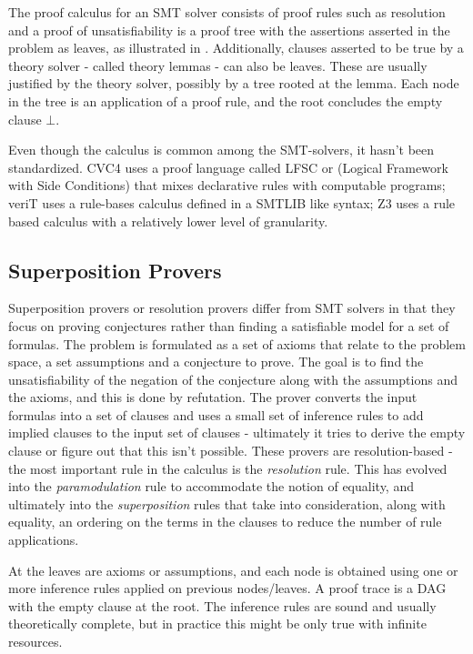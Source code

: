 \documentclass{article}
\begin{document}
	The proof calculus for an SMT solver consists 
	of proof rules such as resolution and a 
	proof of unsatisfiability is a proof tree with 
	the assertions asserted in the problem as 
	leaves, as illustrated in .
	Additionally, clauses asserted to 
	be true by a theory solver - called theory lemmas 
	- can also be leaves. These are usually 
	justified by the theory solver, possibly by 
	a tree rooted at the lemma. Each node in 
	the tree is an application of a proof rule, 
	and the root concludes the empty clause $\bot$.
	
	Even though the calculus is common among the SMT-solvers, 
	it hasn't been standardized. CVC4 uses a proof language called
	LFSC or (Logical Framework with Side Conditions) that mixes 
	declarative rules with computable programs; veriT uses a rule-bases 
	calculus defined in a SMTLIB like syntax; Z3 uses a rule based 
	calculus with a relatively lower level of granularity. 
	
	\subsection{Superposition Provers}
	\label{sup}
	Superposition provers or resolution provers differ 
	from SMT solvers in that they focus on proving 
	conjectures rather than finding a satisfiable model
	for a set of formulas. The problem is formulated 
	as a set of axioms that relate to the problem space, 
	a set assumptions and a conjecture to prove. 
	The goal is to find the unsatisfiability of 
	the negation of the conjecture along with the 
	assumptions and the axioms, and this is done 
	by refutation. The prover converts 
	the input formulas into a set of clauses and 
	uses a small set of inference rules to add 
	implied clauses to the input set of 
	clauses - ultimately it tries to derive 
	the empty clause or figure out that this 
	isn't possible. These provers are resolution-based -
	the most important rule in the calculus is the 
	\textit{resolution} rule. This has evolved into 
	the \textit{paramodulation} rule to accommodate 
	the notion of equality, and ultimately into 
	the \textit{superposition} rules that take into 
	consideration, along with equality, an ordering 
	on the terms in the clauses to reduce the number 
	of rule applications.
	
	At the leaves are axioms or assumptions, and 
	each node is obtained using one or more inference
	rules applied on previous nodes/leaves. 
	A proof trace is a DAG with the empty clause at
	the root. The inference rules are sound and 
	usually theoretically complete, but in practice 
	this might be only true with infinite resources.
	
\end{document}
